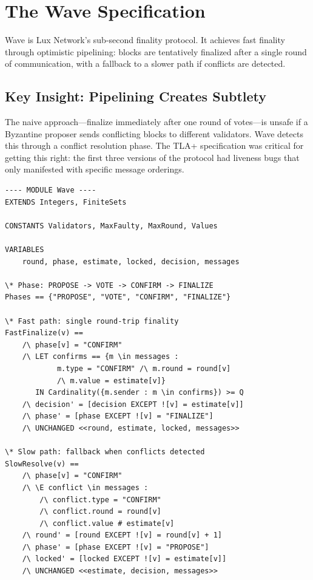 \documentclass[11pt,a4paper]{article}
\begin{document}
\section{The Wave Specification}

Wave is Lux Network's sub-second finality protocol. It achieves fast finality through
optimistic pipelining: blocks are tentatively finalized after a single round of
communication, with a fallback to a slower path if conflicts are detected.

\subsection{Key Insight: Pipelining Creates Subtlety}

The naive approach---finalize immediately after one round of votes---is unsafe if a
Byzantine proposer sends conflicting blocks to different validators. Wave detects this
through a conflict resolution phase. The TLA+ specification was critical for getting
this right: the first three versions of the protocol had liveness bugs that only
manifested with specific message orderings.

\begin{lstlisting}[language=TLA,caption={Wave specification excerpt}]
---- MODULE Wave ----
EXTENDS Integers, FiniteSets

CONSTANTS Validators, MaxFaulty, MaxRound, Values

VARIABLES
    round, phase, estimate, locked, decision, messages

\* Phase: PROPOSE -> VOTE -> CONFIRM -> FINALIZE
Phases == {"PROPOSE", "VOTE", "CONFIRM", "FINALIZE"}

\* Fast path: single round-trip finality
FastFinalize(v) ==
    /\ phase[v] = "CONFIRM"
    /\ LET confirms == {m \in messages :
            m.type = "CONFIRM" /\ m.round = round[v]
            /\ m.value = estimate[v]}
       IN Cardinality({m.sender : m \in confirms}) >= Q
    /\ decision' = [decision EXCEPT ![v] = estimate[v]]
    /\ phase' = [phase EXCEPT ![v] = "FINALIZE"]
    /\ UNCHANGED <<round, estimate, locked, messages>>

\* Slow path: fallback when conflicts detected
SlowResolve(v) ==
    /\ phase[v] = "CONFIRM"
    /\ \E conflict \in messages :
        /\ conflict.type = "CONFIRM"
        /\ conflict.round = round[v]
        /\ conflict.value # estimate[v]
    /\ round' = [round EXCEPT ![v] = round[v] + 1]
    /\ phase' = [phase EXCEPT ![v] = "PROPOSE"]
    /\ locked' = [locked EXCEPT ![v] = estimate[v]]
    /\ UNCHANGED <<estimate, decision, messages>>
\end{lstlisting}
\end{document}
